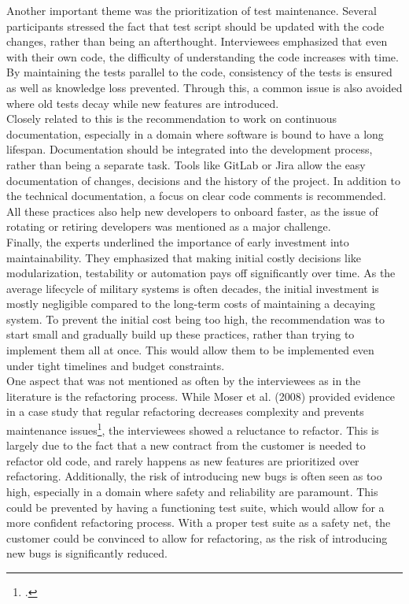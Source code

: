 Another important theme was the prioritization of test maintenance. Several participants stressed the fact that test script should be updated with the code changes, rather than being an afterthought.
Interviewees emphasized that even with their own code, the difficulty of understanding the code increases with time. By maintaining the tests parallel to the code, consistency of the tests is ensured as well as knowledge loss prevented.
Through this, a common issue is also avoided where old tests decay while new features are introduced.\\

Closely related to this is the recommendation to work on continuous documentation, especially in a domain where software is bound to have a long lifespan. Documentation should be integrated into the development process, rather than being a separate task.
Tools like GitLab or Jira allow the easy documentation of changes, decisions and the history of the project. In addition to the technical documentation, a focus on clear code comments is recommended.
All these practices also help new developers to onboard faster, as the issue of rotating or retiring developers was mentioned as a major challenge.\\

Finally, the experts underlined the importance of early investment into maintainability. They emphasized that making initial costly decisions like modularization, testability or automation pays off significantly over time.
As the average lifecycle of military systems is often decades, the initial investment is mostly negligible compared to the long-term costs of maintaining a decaying system.
To prevent the initial cost being too high, the recommendation was to start small and gradually build up these practices, rather than trying to implement them all at once. This would allow them to be implemented even under tight timelines and budget constraints.\\

One aspect that was not mentioned as often by the interviewees as in the literature is the refactoring process. While Moser et al. (2008) provided evidence in a case study that regular refactoring decreases complexity and prevents maintenance issues\footcite[262]{moserCaseStudyImpact2008}, the interviewees showed a reluctance to refactor.
This is largely due to the fact that a new contract from the customer is needed to refactor old code, and rarely happens as new features are prioritized over refactoring. Additionally, the risk of introducing new bugs is often seen as too high, especially in a domain where safety and reliability are paramount.
This could be prevented by having a functioning test suite, which would allow for a more confident refactoring process. With a proper test suite as a safety net, the customer could be convinced to allow for refactoring, as the risk of introducing new bugs is significantly reduced.\\


